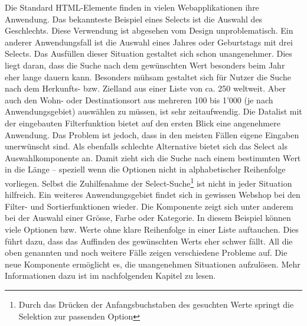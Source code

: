 Die Standard HTML-Elemente finden in vielen Webapplikationen ihre Anwendung. 
Das bekannteste Beispiel eines Selects ist die Auswahl des Geschlechts. 
Diese Verwendung ist abgesehen vom Design unproblematisch. 
Ein anderer Anwendungsfall ist die Auswahl eines Jahres oder Geburtstags mit drei Selects. 
Das Ausfüllen dieser Situation gestaltet sich schon unangenehmer. 
Dies liegt daran, dass die Suche nach dem gewünschten Wert besonders beim Jahr eher lange dauern kann. 
Besonders mühsam gestaltet sich für Nutzer die Suche nach dem Herkunfts- bzw. Zielland aus einer Liste von ca. 250 weltweit. 
Aber auch den Wohn- oder Destinationsort aus mehreren 100 bis 1'000 (je nach Anwendungsgebiet) auswählen zu müssen, ist sehr zeitaufwendig. 
Die Datalist mit der eingebauten Filterfunktion bietet auf den ersten Blick eine angenehmere Anwendung. 
Das Problem ist jedoch, dass in den meisten Fällen eigene Eingaben unerwünscht sind. 
Als ebenfalls schlechte Alternative bietet sich das Select als Auswahlkomponente an. 
Damit zieht sich die Suche nach einem bestimmten Wert in die Länge – speziell wenn die Optionen nicht in alphabetischer Reihenfolge vorliegen. 
Selbst die Zuhilfenahme der Select-Suche\footnote{
    Durch das Drücken der Anfangsbuchstaben des gesuchten Werte springt die Selektion zur passenden Option
} ist nicht in jeder Situation hilfreich. 
Ein weiteres Anwendungsgebiet findet sich in gewissen Webshop bei den Filter- und Sortierfunktionen wieder. 
Die Komponente zeigt sich unter anderem bei der Auswahl einer Grösse, Farbe oder Kategorie. 
In diesem Beispiel können viele Optionen bzw. Werte ohne klare Reihenfolge in einer Liste auftauchen. 
Dies führt dazu, dass das Auffinden des gewünschten Werts eher schwer fällt. 
All die oben genannten und noch weitere Fälle zeigen verschiedene Probleme auf. 
Die neue Komponente ermöglicht es, die unangenehmen Situationen aufzulösen. 
Mehr Informationen dazu ist im nachfolgenden Kapitel zu lesen. 
